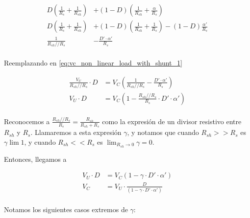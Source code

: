\begin{equation}
    \begin{aligned}
        D \left( \frac{1}{R_s} + \frac{1}{R_{sh}} \right) &+ (1-D) \left(
        \frac{1}{R_{sh}} + \frac{\alpha}{R_s} \right) \\
        D \left( \frac{1}{R_s} + \frac{1}{R_{sh}} \right) &+ (1-D) \left(
        \frac{1}{R_{sh}} + \frac{1}{R_s} \right) - (1-D) \frac{\alpha'}{R_s} \\
        \frac{1}{R_{sh} // R_{s}} &- \frac{D' \cdot \alpha'}{R_s} \\
    \end{aligned}
\end{equation}

Reemplazando en \ref{eq:vc_non_linear_load_with_shunt_1}

\begin{equation}
    \label{eq:vc_non_linear_load_with_shunt_2}
    \begin{aligned}
        \frac{V_U}{R_{sh} // R_{s}} \cdot D &= V_C \left( \frac{1}{R_{sh} //
        R_{s}} - \frac{D' \cdot \alpha'}{R_s} \right) \\
        V_U \cdot D &= V_C \left( 1 - \frac{R_{sh} // R_{s}}{R_s} \cdot D' \cdot
        \alpha'\right) \\
    \end{aligned}
\end{equation}

Reconocemos a $\frac{R_{sh} // R_{s}}{R_s} = \frac{R_{sh}}{R_{sh}+R_s}$ como la
expresión de un divisor resistivo entre $R_{sh}$ y $R_s$. Llamaremos a esta
expresión $\gamma$, y notamos que cuando $R_{sh} >> R_s$ es $\gamma \lim 1$, y
cuando $R_{sh} << R_s$ es $\lim_{R_{sh} \to 0} \gamma = 0$.

Entonces, llegamos a

\begin{equation}
    \label{eq:vc_non_linear_load_with_shunt_final}
    \begin{aligned}
        V_U \cdot D &= V_C \left( 1 - \gamma \cdot D' \cdot \alpha'\right) \\
        V_C &= V_U \cdot \frac{D}{\left( 1 - \gamma \cdot D' \cdot \alpha'\right)} \\
    \end{aligned}
\end{equation}

Notamos los siguientes casos extremos de $\gamma$:

